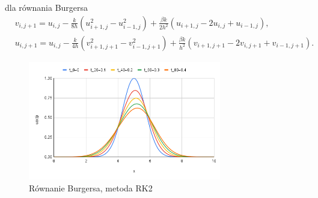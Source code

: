 \documentclass[12pt, a4paper]{article}
\begin{document}
dla równania Burgersa
\begin{equation}
\begin{split}
& v_{i,j+1}=u_{i,j}-\frac{k}{8h}(u_{i+1,j}^{2}-u_{i-1,j}^{2})+\frac{\beta k}{2h^{2}}(u_{i+1,j}-2u_{i,j}+u_{i-1,j}),\\
& u_{i,j+1}=u_{i,j}-\frac{k}{4h}(v_{i+1,j+1}^{2}-v_{i-1,j+1}^{2})+\frac{\beta k}{h^{2}}(v_{i+1,j+1}-2v_{i,j+1}+v_{i-1,j+1}).
\end{split}
\end{equation}
\begin{figure}[h]
\caption{Równanie Burgersa, metoda RK2}
\centering
\includegraphics[width=0.75\textwidth]{7}
\end{figure}
\end{document}
